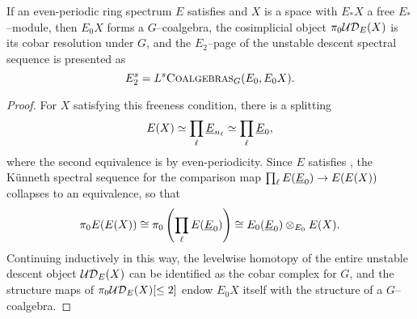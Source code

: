 \begin{lemma}\label{HopfRingFromOneRingSpectrum}
If an even-periodic ring spectrum \(E\) satisfies {\UFH} and \(X\) is a space with \(E_* X\) a free \(E_*\)--module, then \(E_0 X\) forms a \(G\)--coalgebra, the cosimplicial object \(\pi_0 \mathcal{UD}_E(X)\) is its cobar resolution under \(G\), and the \(E_2\)--page of the unstable descent spectral sequence is presented as \[E_2^{s} = L^s\normalfont\textsc{Coalgebras}_G(E_0, E_0 X).\]
\end{lemma}
\begin{proof}
For \(X\) satisfying this freeness condition, there is a splitting \[E(X) \simeq \prod_\ell \underline{\smash{E}}_{n_\ell} \simeq \prod_\ell \underline{\smash{E}}_{0},\] where the second equivalence is by even-periodicity.  Since \(E\) satisfies {\UFH}, the K\"unneth spectral sequence for the comparison map \(\prod_\ell E(\underline{\smash{E}}_{0}) \to E(E(X))\) collapses to an equivalence, so that \[\pi_0 E(E(X)) \cong \pi_0 \left(\prod_\ell E(\underline{\smash{E}}_{0})\right) \cong E_0(\underline{\smash{E}}_{0}) \otimes_{E_0} E(X).\]  Continuing inductively in this way, the levelwise homotopy of the entire unstable descent object \(\mathcal{UD}_E(X)\) can be identified as the cobar complex for \(G\), and the structure maps of \(\pi_0 \mathcal{UD}_E(X)[\le 2]\) endow \(E_0 X\) itself with the structure of a \(G\)--coalgebra.
\end{proof}


